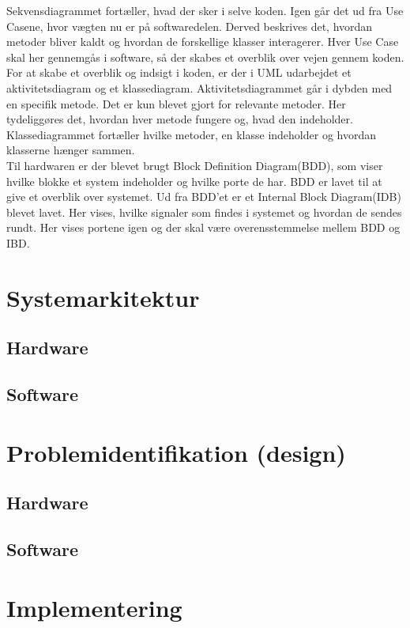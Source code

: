 Sekvensdiagrammet fortæller, hvad der sker i selve koden. Igen går det ud fra Use Casene, hvor vægten nu er på softwaredelen. Derved beskrives det, hvordan metoder bliver kaldt og hvordan de forskellige klasser interagerer. Hver Use Case skal her gennemgås i software, så der skabes et overblik over vejen gennem koden.\\
\newline 
For at skabe et overblik og indsigt i koden, er der i UML udarbejdet et aktivitetsdiagram og et klassediagram. Aktivitetsdiagrammet går i dybden med en specifik metode. Det er kun blevet gjort for relevante metoder. Her tydeliggøres det, hvordan hver metode fungere og, hvad den indeholder.  Klassediagrammet fortæller hvilke metoder, en klasse indeholder og hvordan klasserne hænger sammen.\\
\newline  
Til hardwaren er der blevet brugt Block Definition Diagram(BDD), som viser hvilke blokke et system indeholder og hvilke porte de har. BDD er lavet til at give et overblik over systemet. Ud fra BDD’et er et Internal Block Diagram(IDB) blevet lavet. Her vises, hvilke signaler som findes i systemet og hvordan de sendes rundt. Her vises portene igen og der skal være overensstemmelse  mellem BDD og IBD.    

\section{Systemarkitektur}
\subsection{Hardware}
\subsection{Software}

\section{Problemidentifikation (design)}
\subsection{Hardware}
\subsection{Software}

\section{Implementering}

